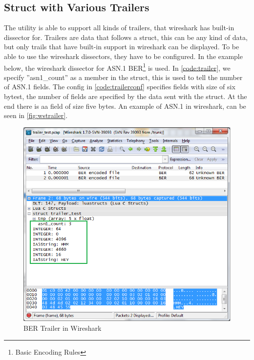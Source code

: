 \subsection{Struct with Various Trailers}
The utility is able to support all kinds of trailers, that wireshark has 
built-in dissector for. Trailers are data that follows a struct, this can be 
any kind of data, but only trails that have built-in support in wireshark can 
be displayed.  To be able to use the wireshark dissectors, they have to be 
configured. In the example below, the wireshark dissector for ASN.1 
BER\footnote{Basic Encoding Rules}  is used.  In \autoref{code:trailer}, we 
specify ''asn1\_count'' as a member in the struct, this is used to tell the 
number of ASN.1 fields. The config in  \autoref{code:trailerconf} specifies 
fields with size of six bytest, the number of fields are specified by the data 
sent with the struct. At the end there is aa field of size five bytes. An 
example of ASN.1 in wireshark, can be seen in \autoref{fig:wstrailer}.

\begin{figure}[ht]
	\center
	\includegraphics[width=\textwidth]{./sprints/img/wireshark_trailer}
	\caption{BER Trailer in Wireshark\label{fig:wstrailer}}
\end{figure}



